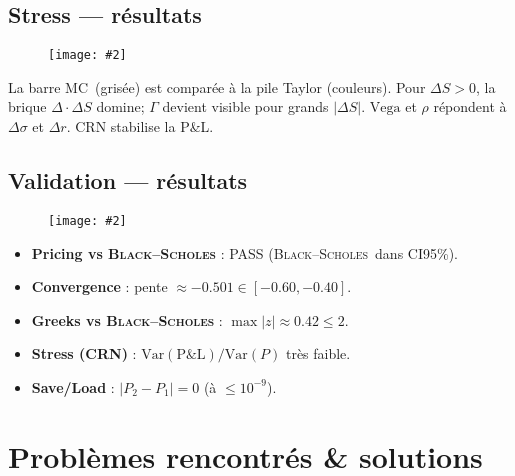 \documentclass[11pt,a4paper]{article}
\newcommand{\imgfull}[2][\textwidth]{\begin{figure}[H]\centering\texttt{[image: \#2]}\end{figure}}
\newcommand{\bs}{\textsc{Black--Scholes}}
\newcommand{\ci}{\textsc{CI95}\%}
\newcommand{\mc}{\textsc{MC}}
\begin{document}
\subsection{Stress — résultats}
\imgfull{stress_res.png}
La barre \mc\ (grisée) est comparée à la pile Taylor (couleurs). Pour \(\Delta S>0\), la brique \(\Delta\cdot\Delta S\) domine; \(\Gamma\) devient visible pour grands \(|\Delta S|\). \(\text{Vega}\) et \(\rho\) répondent à \(\Delta\sigma\) et \(\Delta r\). CRN stabilise la P\&L.

\subsection{Validation — résultats}
\imgfull{validation_res.png}
\begin{itemize}[leftmargin=*]
  \item \textbf{Pricing vs \bs} : PASS (\bs\ dans \ci).
  \item \textbf{Convergence} : pente \(\approx -0.501 \in[-0.60,-0.40]\).
  \item \textbf{Greeks vs \bs} : \(\max|z|\approx 0.42 \le 2\).
  \item \textbf{Stress (CRN)} : \(\mathrm{Var(P\&L)}/\mathrm{Var}(P)\) très faible.
  \item \textbf{Save/Load} : \(|P_2-P_1|=0\) (à \(\le 10^{-9}\)).
\end{itemize}

\section{Problèmes rencontrés \& solutions}
\end{document}
